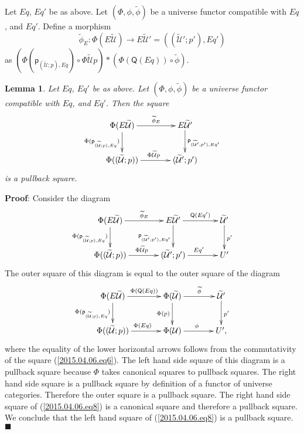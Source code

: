 \documentclass[12pt]{article}
\numberwithin{equation}{section}
\newenvironment{eq}{\begin{equation}}{\end{equation}}
\newenvironment{myproof}{{\bf Proof}:}{$\blacksquare$ \vskip 5mm }
\newtheorem{lemma}[proposition]{Lemma}
\newcommand{\sr}{\rightarrow}
\newcommand{\wt}{\widetilde}
\newcommand{\p}{\mathsf{p}}
\newcommand{\U}{\mathcal{U}}
\newcommand{\Q}{\mathsf{Q}}
\begin{document}
%
Let $Eq$, $Eq'$ be as above. Let $(\Phi,\phi,\wt{\phi})$ be a universe functor
compatible with $Eq$, and $Eq'$. Define a morphism
%
$$\wt{\phi}_{E}:\Phi(E\wt{\U})\sr E\wt{\U}'=((\wt{\U}';p'),Eq')$$
%
as $(\Phi(\p_{(\wt{\U};p),Eq})\circ \Phi\wt{\U}p)*(\Phi(\Q(Eq))\circ \wt{\phi})$.
%
\begin{lemma}
\label{2015.04.06.l4} Let $Eq$, $Eq'$ be as above. Let $(\Phi,\phi,\wt{\phi})$
be a universe functor compatible with $Eq$, and $Eq'$. Then the square
%
$$
\begin{xy}
          \xymatrix@C=3pc{ \Phi(E\wt{\U}) \ar[r]^-{\wt{\phi}_{E}}
            \ar[d]_{\Phi(\p_{(\wt{\U};p),Eq})} & E\wt{\U}'
            \ar[d]^{\p_{(\wt{\U}';p'),Eq'}}\\ \Phi((\wt{\U};p))
            \ar[r]^{\Phi\wt{\U}p} & (\wt{\U}';p') }
\end{xy}
$$
%
is a pullback square.
%
\end{lemma} 
%
\begin{myproof}
Consider the diagram
%
\begin{eq}\label{2015.04.06.eq8}
\begin{xy}
          \xymatrix@C=3pc{ \Phi(E\wt{\U})
            \ar[r]^-{\wt{\phi}_{E}}\ar[d]_{\Phi(\p_{(\wt{\U};p),Eq})} & E\wt{\U}'
            \ar[r]^-{\Q(Eq')}\ar[d]_{\p_{(\wt{\U}';p'),Eq'}} & \wt{\U}'
            \ar[d]^{p'}\\ \Phi((\wt{\U};p)) \ar[r]^{\Phi\wt{\U}p} & (\wt{\U}';p')
            \ar[r]^{Eq'} & U' }
\end{xy}
\end{eq}%
%
The outer square of this diagram is equal to the outer square of the diagram
%
\begin{eq}\label{2015.04.06.eq7}
\begin{xy}
          \xymatrix@C=3pc{ \Phi(E\wt{\U})
            \ar[r]^-{\Phi(\Q(Eq))}\ar[d]_{\Phi(\p_{(\wt{\U};p),Eq})} &
            \Phi(\wt{\U}) \ar[r]^-{\wt{\phi}}\ar[d]_{\Phi(p)} & \wt{\U}'
            \ar[d]^{p'}\\ \Phi((\wt{\U};p)) \ar[r]^{\Phi(Eq)} & \Phi(\U)
            \ar[r]^{\phi} & U', }
\end{xy}
\end{eq}%
%
where the equality of the lower horizontal arrows follows from the
commutativity of the square (\ref{2015.04.06.eq6}). The left hand side square
of this diagram is a pullback square because $\Phi$ takes canonical squares to
pullback squares. The right hand side square is a pullback square by definition
of a functor of universe categories. Therefore the outer square is a pullback
square. The right hand side square of (\ref{2015.04.06.eq8}) is a canonical
square and therefore a pullback square. We conclude that the left hand square
of (\ref{2015.04.06.eq8}) is a pullback square.
\end{myproof}
\end{document}
